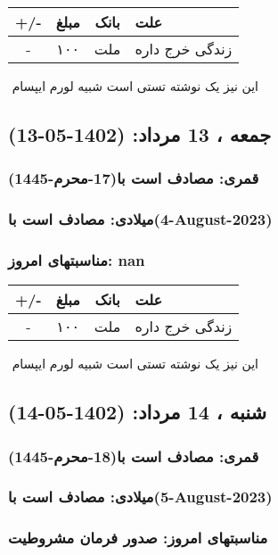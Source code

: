 \documentclass{article}
\newcommand{\rnote}[1]{\marginpar{\textcolor{color}{\StrSubstitute{\##1}{ }{\_}}}}
\newcommand{\myRow}[4]{
    #1 & #2 & #3 & #4 \\ \hline
}
\begin{document}
\begin{tabular}{ | c | c | c | p{5cm} |}
    \hline
    \myRow{ +/- }{مبلغ}{بانک}{علت}
    \myRow{-}{۱۰۰}{ملت}{زندگی خرج داره}
\end{tabular}
\newline
\newline

‌
\rnote{تست}
این نیز یک نوشته تستی است شبیه لورم ایپسام




\newpage
{}
\textcolor{color}{
\section{ جمعه ، 13 مرداد: (1402-05-13) }
\subsubsection*{قمری: مصادف است با(17-محرم-1445)} 
\subsubsection*{میلادی: مصادف است با(4-August-2023)}
\subsubsection*{مناسبتهای امروز: nan}
}


\begin{tabular}{ | c | c | c | p{5cm} |}
    \hline
    \myRow{ +/- }{مبلغ}{بانک}{علت}
    \myRow{-}{۱۰۰}{ملت}{زندگی خرج داره}
\end{tabular}
\newline
\newline

‌
\rnote{تست}
این نیز یک نوشته تستی است شبیه لورم ایپسام




\newpage
{}
\textcolor{color}{
\section{ شنبه ، 14 مرداد: (1402-05-14) }
\subsubsection*{قمری: مصادف است با(18-محرم-1445)} 
\subsubsection*{میلادی: مصادف است با(5-August-2023)}
\subsubsection*{مناسبتهای امروز: صدور فرمان مشروطیت}
}
\end{document}
